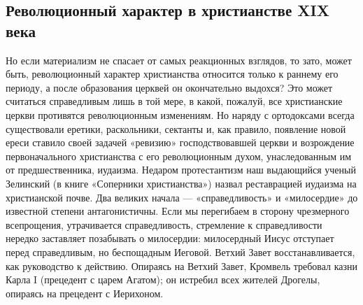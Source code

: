 \subsection{Революционный характер в христианстве XIX века}

Но если материализм не спасает от самых реакционных взглядов, то зато,
может быть, революционный характер христианства относится только к
раннему его периоду, а после образования церквей он окончательно
выдохся? Это может считаться справедливым лишь в той мере, в какой,
пожалуй, все христианские церкви противятся революционным изменениям.
Но наряду с ортодоксами всегда существовали еретики, раскольники,
сектанты и, как правило, появление новой ереси ставило своей задачей
«ревизию» господствовавшей церкви и возрождение первоначального
христианства с его революционным духом, унаследованным им от
предшественника, иудаизма. Недаром протестантизм наш выдающийся ученый
Зелинский (в книге «Соперники христианства») назвал реставрацией
иудаизма на христианской почве. Два великих начала ---
«справедливость» и «милосердие» до известной степени антагонистичны.
Если мы перегибаем в сторону чрезмерного всепрощения, утрачивается
справедливость, стремление к справедливости нередко заставляет
позабывать о милосердии: милосердный Иисус отступает перед
справедливым, но беспощадным Иеговой. Ветхий Завет восстанавливается,
как руководство к действию. Опираясь на Ветхий Завет, Кромвель
требовал казни Карла I (прецедент с царем Агатом); он истребил всех
жителей Дрогелы, опираясь на прецедент с Иерихоном.

